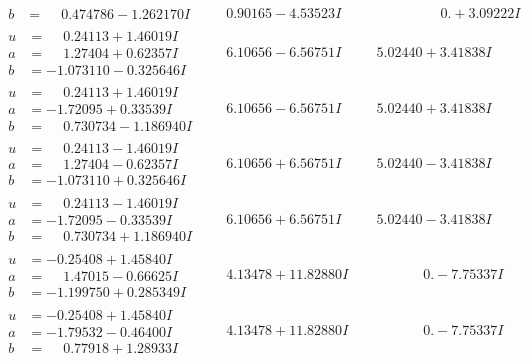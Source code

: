 \documentclass[1p]{elsarticle_modified}
\theoremstyle{definition}
\begin{document}
$$\begin{array}{c|c|c}
\begin{aligned}
b &= \phantom{-}0.474786 - 1.262170 I\end{aligned}
 & \phantom{-}0.90165 - 4.53523 I & \phantom{-0.000000 -}0. + 3.09222 I \\ \hline\begin{aligned}
u &= \phantom{-}0.24113 + 1.46019 I \\
a &= \phantom{-}1.27404 + 0.62357 I \\
b &= -1.073110 - 0.325646 I\end{aligned}
 & \phantom{-}6.10656 - 6.56751 I & \phantom{-}5.02440 + 3.41838 I \\ \hline\begin{aligned}
u &= \phantom{-}0.24113 + 1.46019 I \\
a &= -1.72095 + 0.33539 I \\
b &= \phantom{-}0.730734 - 1.186940 I\end{aligned}
 & \phantom{-}6.10656 - 6.56751 I & \phantom{-}5.02440 + 3.41838 I \\ \hline\begin{aligned}
u &= \phantom{-}0.24113 - 1.46019 I \\
a &= \phantom{-}1.27404 - 0.62357 I \\
b &= -1.073110 + 0.325646 I\end{aligned}
 & \phantom{-}6.10656 + 6.56751 I & \phantom{-}5.02440 - 3.41838 I \\ \hline\begin{aligned}
u &= \phantom{-}0.24113 - 1.46019 I \\
a &= -1.72095 - 0.33539 I \\
b &= \phantom{-}0.730734 + 1.186940 I\end{aligned}
 & \phantom{-}6.10656 + 6.56751 I & \phantom{-}5.02440 - 3.41838 I \\ \hline\begin{aligned}
u &= -0.25408 + 1.45840 I \\
a &= \phantom{-}1.47015 - 0.66625 I \\
b &= -1.199750 + 0.285349 I\end{aligned}
 & \phantom{-}4.13478 + 11.82880 I & \phantom{-0.000000 } 0. - 7.75337 I \\ \hline\begin{aligned}
u &= -0.25408 + 1.45840 I \\
a &= -1.79532 - 0.46400 I \\
b &= \phantom{-}0.77918 + 1.28933 I\end{aligned}
 & \phantom{-}4.13478 + 11.82880 I & \phantom{-0.000000 } 0. - 7.75337 I\\

\end{array}$$
\end{document}
